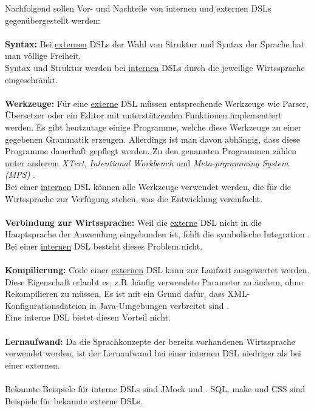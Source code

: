 Nachfolgend sollen Vor- und Nachteile von internen und externen DSLs gegenübergestellt werden:
\\ \\
\textbf{Syntax:}
Bei \underline{externen} DSLs der Wahl von Struktur und Syntax der Sprache hat man völlige Freiheit.\\
Syntax und Struktur werden bei \underline{internen} DSLs durch die jeweilige Wirtssprache eingeschränkt.
\\ \\
\textbf{Werkzeuge:}
Für eine \underline{externe} DSL müssen entsprechende Werkzeuge wie Parser, Übersetzer oder ein Editor mit unterstützenden Funktionen implementiert 
werden. Es gibt heutzutage einige Programme, welche diese Werkzeuge zu einer gegebenen Grammatik erzeugen. Allerdings ist man davon abhängig, dass 
diese Programme dauerhaft gepflegt werden. Zu den genannten Programmen zählen unter anderem \emph{XText}\cite{www:xtext}, \emph{Intentional 
Workbench} \cite{www:intentsoft} und \emph{Meta-prgramming System (MPS)} \cite{www:mps}.\\
Bei einer \underline{internen} DSL können alle Werkzeuge verwendet werden, die für die Wirtssprache zur Verfügung stehen, was die Entwicklung vereinfacht.
\\ \\
\textbf{Verbindung zur Wirtssprache:}
Weil die \underline{externe} DSL nicht in die Hauptsprache der Anwendung eingebunden ist, fehlt die symbolische Integration \cite{www:fowlerWorkbench}.\\
Bei einer \underline{internen} DSL besteht dieses Problem nicht.
\\ \\
\textbf{Kompilierung:}
Code einer \underline{externen} DSL kann zur Laufzeit ausgewertet werden. Diese Eigenschaft erlaubt es, z.B. häufig verwendete Parameter zu ändern, ohne 
Rekompilieren zu müssen. Es ist mit ein Grund dafür, dass XML-Konfigurationsdateien in Java-Umgebungen verbreitet sind \cite{www:fowlerWorkbench}.\\
Eine interne DSL bietet diesen Vorteil nicht.
\\ \\
\textbf{Lernaufwand:}
Da die Sprachkonzepte der bereits vorhandenen Wirtssprache verwendet werden, ist der Lernaufwand bei einer internen DSL niedriger als bei einer externen.
\\ \\ %
Bekannte Beispiele für interne DSLs sind JMock und . SQL, make und CSS sind Beispiele für bekannte externe DSLs.

